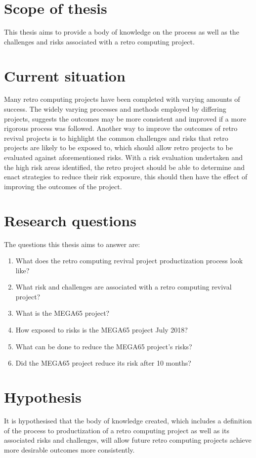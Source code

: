 \section{Scope of thesis}
This thesis aims to provide a body of knowledge on the process as well as the challenges and risks associated with a retro computing project.

\section{Current situation}
Many retro computing projects have been completed with varying amounts of success. The widely varying processes and methods employed by differing projects, suggests the outcomes may be more consistent and improved if a more rigorous process was followed. Another way to improve the outcomes of retro revival projects is to highlight the common challenges and risks that retro projects are likely to be exposed to, which should allow retro projects to be evaluated against aforementioned risks. With a risk evaluation undertaken and the high risk areas identified, the retro project should be able to determine and enact strategies to reduce their risk exposure, this should then have the effect of improving the outcomes of the project.

\section{Research questions}
The questions this thesis aims to answer are:
\begin{enumerate}
\item What does the retro computing revival project productization process look like?
\item What risk and challenges are associated with a retro computing revival project?
\item What is the MEGA65 project? 
\item How exposed to risks is the MEGA65 project July 2018?
\item What can be done to reduce the MEGA65 project's risks?
\item Did the MEGA65 project reduce its risk after 10 months?
\end{enumerate}

\section{Hypothesis}
It is hypothesised that the body of knowledge created, which includes a definition of the process to productization of a retro computing project as well as its associated risks and challenges, will allow future retro computing projects achieve more desirable outcomes more consistently.


